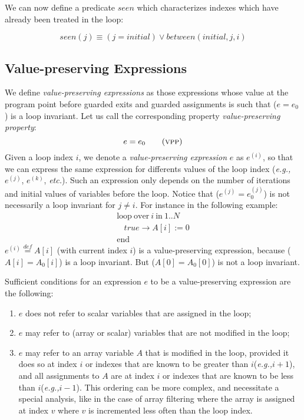 \documentclass[a4paper,10pt]{article}
\newcommand{\eg}{\textit{e.g.,}\xspace}
\newcommand{\etc}{\textit{etc.}\xspace}
\newcommand{\idx}{\ensuremath{i}\xspace}
\newcommand{\idxinitial}{\ensuremath{\mathit{initial}}\xspace}
\newcommand{\at}[1]{{(#1)}}
\newcommand{\KWloop}{\ensuremath{\mathrm{loop}~}}
\newcommand{\KWend}{\ensuremath{\mathrm{end}~}}
\newcommand{\KWover}{\ensuremath{\mathrm{over}~}}
\newcommand{\KWin}{\ensuremath{~\mathrm{in}~}}
\newcommand{\seen}[1]{\ensuremath{\mathit{seen}(#1)}\xspace}
\newcommand{\Pseen}{\ensuremath{\mathit{seen}}\xspace}
\newcommand{\between}[3]{\ensuremath{\mathit{between}{(#1,#2,#3)}}\xspace}
\newcommand{\symdef}{\ensuremath{\overset{\mathit{def}}{=}}}
\newcommand{\vpp}{\textsc{vpp}\xspace}
\begin{document}
We can now define a predicate \Pseen which characterizes indexes which have already
been treated in the loop:

$$\seen{j} \equiv (j = \idxinitial) \lor \between{\idxinitial}{j}{\idx}$$

\subsection{Value-preserving Expressions}

We define \textit{value-preserving expressions} as those expressions whose
value at the program point before guarded exits and guarded assignments is
such that ($e=e_0$) is a loop invariant. Let us call the corresponding property
\textit{value-preserving property}:
\begin{equation}
 e=e_0 \tag{\vpp}
\end{equation}
Given a loop index \idx, we denote a \textit{value-preserving expression} $e$
as $e^\at{\idx}$, so that we can express the same expression for differents
values of the loop index (\eg $e^\at{j}$, $e^\at{k}$, \etc). Such an expression
only depends on the number of iterations and initial values of variables
before the loop. Notice that ($e^\at{j} = e_0^\at{j}$) is not necessarily a
loop invariant for $j \neq i$.  For instance in the following example:
$$\begin{array}{l}
  \KWloop \KWover i \KWin 1 .. N \\
  ~~~~ \mathit{true} \rightarrow A[i] := 0\\
  \KWend
\end{array}$$
$e^\at{\idx} \symdef A[\idx]$ (with current index \idx) is a 
value-preserving expression, because ($A[\idx]=A_0[\idx]$) is a loop 
invariant. But ($A[0]=A_0[0]$) is not a loop invariant.

Sufficient conditions for an expression $e$ to be a value-preserving expression
are the following:
\begin{enumerate}
\item $e$ does not refer to scalar variables that are assigned in the loop;
\item $e$ may refer to (array or scalar) variables that are not modified in the loop;
\item $e$ may refer to an array variable $A$ that is modified in the loop,
  provided it does so at index \idx or indexes that are known to be greater
  than \idx (\eg $\idx + 1$), and all assignments to $A$ are at index \idx or
  indexes that are known to be less than \idx (\eg $\idx - 1$). This ordering
  can be more complex, and necessitate a special analysis, like in the case of
  array filtering where the array is assigned at index $v$ where $v$ is
  incremented less often than the loop index.
\end{enumerate}
\end{document}
